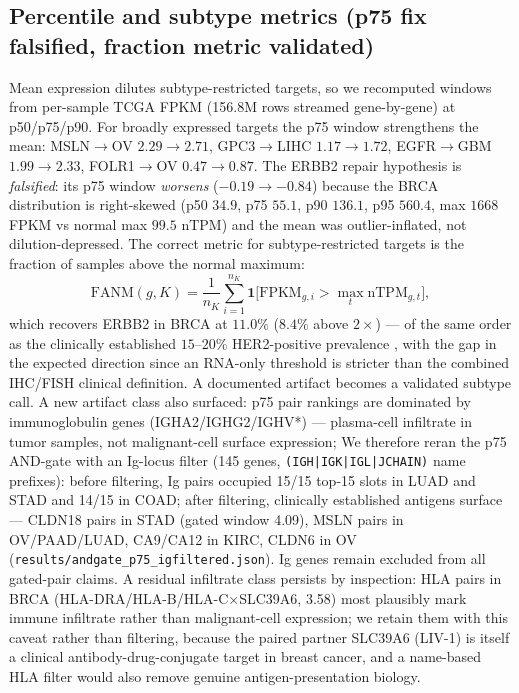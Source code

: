 \documentclass[11pt]{article}
\begin{document}
\subsection{Percentile and subtype metrics (p75 fix falsified, fraction metric validated)}
Mean expression dilutes subtype-restricted targets, so we recomputed windows from per-sample TCGA FPKM (156.8M rows streamed gene-by-gene) at p50/p75/p90. For broadly expressed targets the p75 window strengthens the mean: MSLN$\to$OV $2.29\to2.71$, GPC3$\to$LIHC $1.17\to1.72$, EGFR$\to$GBM $1.99\to2.33$, FOLR1$\to$OV $0.47\to0.87$. The ERBB2 repair hypothesis is \emph{falsified}: its p75 window \emph{worsens} ($-0.19\to-0.84$) because the BRCA distribution is right-skewed (p50 $34.9$, p75 $55.1$, p90 $136.1$, p95 $560.4$, max $1668$ FPKM vs normal max $99.5$ nTPM) and the mean was outlier-inflated, not dilution-depressed. The correct metric for subtype-restricted targets is the fraction of samples above the normal maximum:
\begin{equation}
\mathrm{FANM}(g,K)=\frac{1}{n_K}\sum_{i=1}^{n_K}\mathbf 1\big[\mathrm{FPKM}_{g,i}>\max_t \mathrm{nTPM}_{g,t}\big],
\end{equation}
which recovers ERBB2 in BRCA at $11.0\%$ ($8.4\%$ above $2\times$) --- of the same order as the clinically established $15$--$20\%$ HER2-positive prevalence \cite{her2}, with the gap in the expected direction since an RNA-only threshold is stricter than the combined IHC/FISH clinical definition. A documented artifact becomes a validated subtype call. A new artifact class also surfaced: p75 pair rankings are dominated by immunoglobulin genes (IGHA2/IGHG2/IGHV*) --- plasma-cell infiltrate in tumor samples, not malignant-cell surface expression; We therefore reran the p75 AND-gate with an Ig-locus filter (145 genes, \texttt{(IGH|IGK|IGL|JCHAIN)} name prefixes): before filtering, Ig pairs occupied 15/15 top-15 slots in LUAD and STAD and 14/15 in COAD; after filtering, clinically established antigens surface --- CLDN18 pairs in STAD (gated window 4.09), MSLN pairs in OV/PAAD/LUAD, CA9/CA12 in KIRC, CLDN6 in OV (\texttt{results/andgate\_p75\_igfiltered.json}). Ig genes remain excluded from all gated-pair claims. A residual infiltrate class persists by inspection: HLA pairs in BRCA (HLA-DRA/HLA-B/HLA-C$\times$SLC39A6, 3.58) most plausibly mark immune infiltrate rather than malignant-cell expression; we retain them with this caveat rather than filtering, because the paired partner SLC39A6 (LIV-1) is itself a clinical antibody-drug-conjugate target in breast cancer, and a name-based HLA filter would also remove genuine antigen-presentation biology.
\end{document}
